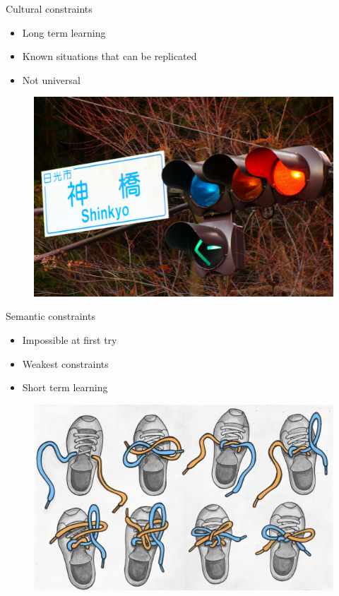 \documentclass{beamer}
\begin{document}
\begin{frame}{Cultural constraints}
    \begin{itemize}
		\item Long term learning
    		\item Known situations that can be replicated
    		\item Not universal
    \end{itemize}
    \begin{figure}[ht]
    \includegraphics[scale=0.1]{japan-traffic-light.jpg}
    \end{figure}
\end{frame}

\begin{frame}{Semantic constraints}
    \begin{itemize}
    \item Impossible at first try
    \item Weakest constraints
    \item Short term learning
    \end{itemize}
    \begin{figure}
    \includegraphics[scale=0.4]{tie_your_shoes.jpg}
    \end{figure}
\end{frame}
\end{document}
